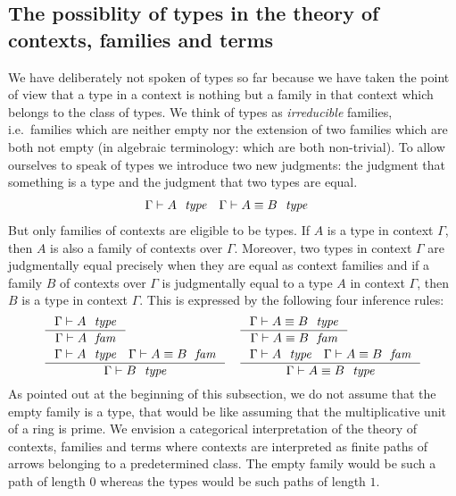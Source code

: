 \subsection{The possiblity of types in the theory of contexts, families and
terms}
\label{types}
We have deliberately not spoken of types so far because we have taken the point
of view that a type in a context is nothing but a family in that context which
belongs to the class of types. We think of types as \emph{irreducible} families,
i.e.\ families which are neither empty nor the extension of two
families which are both not empty (in algebraic terminology: which
are both non-trivial). To allow ourselves to speak of types we introduce two
new judgments: the judgment that something is a type and the judgment that two
types are equal.
\begin{align*}
\jtype*{\Gamma}{A} 
& \jtypeeq*{\Gamma}{A}{B}
\end{align*}
But only families of contexts are eligible to be types. If $A$ is a type
in context $\Gamma$, then $A$ is also a family of contexts over $\Gamma$. 
Moreover, two types in context $\Gamma$ are judgmentally equal precisely when they are equal
as context families and if a family $B$ of contexts over $\Gamma$ is
judgmentally equal to a type $A$ in context $\Gamma$, then $B$ is a type in
context $\Gamma$. This is expressed by the following four inference rules:
\begin{align*}
& \inference
  { \jtype{\Gamma}{A}
    }
  { \jfam{\Gamma}{A}
    }
& & \inference
    { \jtypeeq{\Gamma}{A}{B}
      }
    { \jfameq{\Gamma}{A}{B}
      }
    \\
& \inference
  { \jtype{\Gamma}{A}
    \jfameq{\Gamma}{A}{B}
    }
  { \jtype{\Gamma}{B}
    }
& & \inference
    { \jtype{\Gamma}{A}
      \jfameq{\Gamma}{A}{B}
      }
    { \jtypeeq{\Gamma}{A}{B}
      }
\end{align*}
As pointed out at the beginning of this subsection, 
we do not assume that the empty family is a type, that would be like
assuming that the multiplicative unit of a ring is prime. We envision a
categorical interpretation of the theory of contexts, families and terms where 
contexts are interpreted as finite paths of arrows belonging to a predetermined
class. The empty family would be such a path of length $0$ whereas the types
would be such paths of length $1$.

